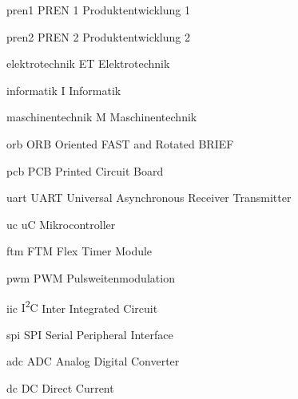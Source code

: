 \newacronym
  {pren1}                 %
  {PREN 1}                %
  {Produktentwicklung 1}  %

\newacronym
  {pren2}                 %
  {PREN 2}                %
  {Produktentwicklung 2}  %

\newacronym
  {elektrotechnik}                    %
  {ET}                    %
  {Elektrotechnik}        %

\newacronym
  {informatik}             %
  {I}                      %
  {Informatik}             %

\newacronym
  {maschinentechnik}       %
  {M}                      %
  {Maschinentechnik}       %

\newacronym
  {orb}                                    %
  {ORB}                                    %
  {Oriented FAST and Rotated BRIEF}        %

\newacronym
  {pcb}                         %
  {PCB}                         %
  {Printed Circuit Board}       %

\newacronym
  {uart}       %
  {UART}                      %
  {Universal Asynchronous Receiver Transmitter}       %

\newacronym
  {uc}       %
  {uC}                      %
  {Mikrocontroller}       %

\newacronym
  {ftm}       %
  {FTM}                      %
  {Flex Timer Module}       %

\newacronym
  {pwm}                 %
  {PWM}                %
  {Pulsweitenmodulation}  %

\newacronym
  {iic}                 %
  {I\textsuperscript{2}C}                %
  {Inter Integrated Circuit}  %


\newacronym
  {spi}                 %
  {SPI}                %
  {Serial Peripheral Interface}  %

\newacronym
  {adc}                 %
  {ADC}                %
  {Analog Digital Converter}  %

\newacronym
  {dc}                 %
  {DC}                %
  {Direct Current}  %


